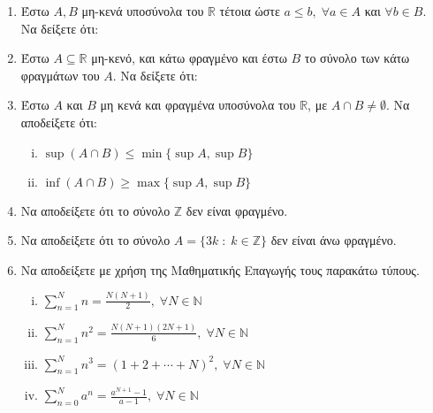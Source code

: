 \begin{enumerate}
    \item Έστω $ A, B $ μη-κενά υποσύνολα του $ \mathbb{R} $ τέτοια ώστε 
      $ a \leq b, \; \forall a \in A $ και $ \forall b \in B $.
      Να δείξετε ότι:

    \item Έστω $ A \subseteq \mathbb{R} $ μη-κενό, και κάτω φραγμένο και έστω 
      $ B $ το σύνολο των κάτω φραγμάτων του $A$. Να δείξετε ότι:

    \item Έστω $A$ και $B$ μη κενά και φραγμένα υποσύνολα του $ \mathbb{R} $, με 
      $ A \cap B \neq \emptyset $. Να αποδείξετε ότι:
      \begin{enumerate}[i)]
        \item $ \sup {(A \cap B)} \leq \min \{ \sup A, \sup B \} $
        \item $ \inf {(A \cap B)} \geq \max \{ \sup A, \sup B \} $
      \end{enumerate}

    \item Να αποδείξετε ότι το σύνολο $ \mathbb{Z} $ δεν είναι φραγμένο.

    \item \label{ask:3z} Να αποδείξετε ότι το σύνολο 
      $ A = \{ 3k \; : \; k \in \mathbb{Z} \} $ δεν είναι άνω φραγμένο.

    \item Να αποδείξετε με χρήση της Μαθηματικής Επαγωγής τους παρακάτω τύπους.
      \label{eq:epagsums}
      \begin{enumerate}[i)]
        \item $ \sum_{n=1}^{N} n = \frac{N(N+1)}{2},\; \forall N \in
          \mathbb{N} $
        \item $ \sum_{n=1}^{N} n^{2} = \frac{N(N+1)(2N+1)}{6},\; \forall 
          N \in \mathbb{N} $
        \item $ \sum_{n=1}^{N} n^{3} = (1+2+\cdots + N)^{2}, \; 
          \forall N \in \mathbb{N} $
        \item $ \sum_{n=0}^{N} a^{n} = \frac{a^{N+1} - 1}{a-1},\; 
          \forall N \in \mathbb{N}$
      \end{enumerate}


\end{enumerate}
